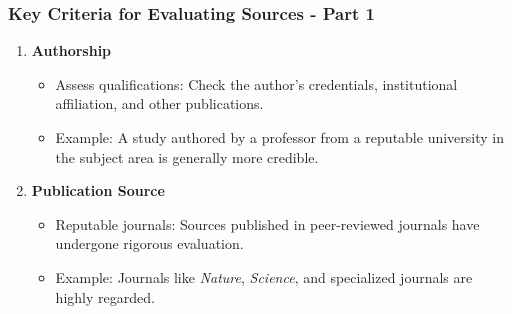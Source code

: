 \documentclass[aspectratio=169]{beamer}
\begin{document}
\begin{frame}[fragile]
    \frametitle{Key Criteria for Evaluating Sources - Part 1}
    \begin{enumerate}
        \item \textbf{Authorship}
        \begin{itemize}
            \item Assess qualifications: Check the author's credentials, institutional affiliation, and other publications.
            \item Example: A study authored by a professor from a reputable university in the subject area is generally more credible.
        \end{itemize}
        
        \item \textbf{Publication Source}
        \begin{itemize}
            \item Reputable journals: Sources published in peer-reviewed journals have undergone rigorous evaluation.
            \item Example: Journals like \textit{Nature}, \textit{Science}, and specialized journals are highly regarded.
        \end{itemize}
    \end{enumerate}
\end{frame}
\end{document}
